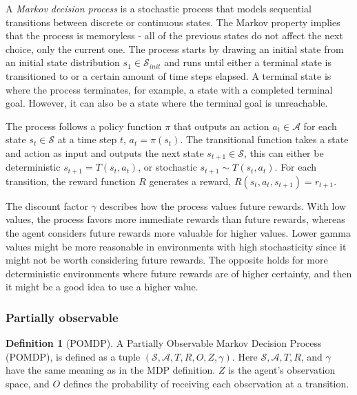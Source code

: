 \documentclass[12pt,A4]{report}
\theoremstyle{definition}
\newtheorem{definition}{Definition}[section]
\begin{document}
A \textit{Markov decision process} is a stochastic process that models sequential transitions between discrete or continuous states. The Markov property implies that the process is memoryless - all of the previous states do not affect the next choice, only the current one.  The process starts by drawing an initial state from an initial state distribution $s_1 \in \mathcal{S}_{init}$ and runs until either a terminal state is transitioned to or a certain amount of time steps elapsed. A terminal state is where the process terminates, for example, a state with a completed terminal goal. However, it can also be a state where the terminal goal is unreachable.

The process follows a policy function $\pi$ that outputs an action $a_t \in \mathcal{A}$ for each state $s_t \in \mathcal{S}$ at a time step $t$, $a_t = \pi(s_t)$. The transitional function takes a state and action as input and outputs the next state $s_{t+1} \in \mathcal{S}$, this can either be deterministic $s_{t+1} = T(s_t, a_t)$, or stochastic $s_{t+1} \sim T(s_t, a_t)$. For each transition, the reward function $R$  generates a reward, $R(s_t, a_t, s_{t+1}) = r_{t+1}$. 



The discount factor $\gamma$ describes how the process values future rewards. With low values, the process favors more immediate rewards than future rewards, whereas the agent considers future rewards more valuable for higher values. Lower gamma values might be more reasonable in environments with high stochasticity since it might not be worth considering future rewards. The opposite holds for more deterministic environments where future rewards are of higher certainty, and then it might be a good idea to use a higher value.


\subsubsection{Partially observable}

\begin{definition}[POMDP]
    A Partially Observable Markov Decision Process (POMDP), is defined as a tuple $(\mathcal{S}, \mathcal{A}, T, R, O, Z, \gamma)$. Here $\mathcal{S}, \mathcal{A}, T, R$, and $\gamma$ have the same meaning as in the MDP definition. $Z$ is the agent's observation space, and $O$ defines the probability of receiving each observation at a transition. 
\end{definition}
\end{document}

